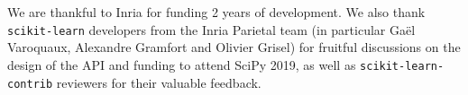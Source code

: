 \documentclass[twoside,11pt]{article}
\begin{document}
\acks

We are thankful to Inria for funding 2 years of development. We also thank \texttt{scikit-learn} developers from the Inria Parietal team (in particular Gaël Varoquaux, Alexandre Gramfort and Olivier Grisel) for fruitful discussions on the design of the API and funding to attend SciPy 2019, as well as \texttt{scikit-learn-contrib} reviewers for their valuable feedback.





\end{document}
